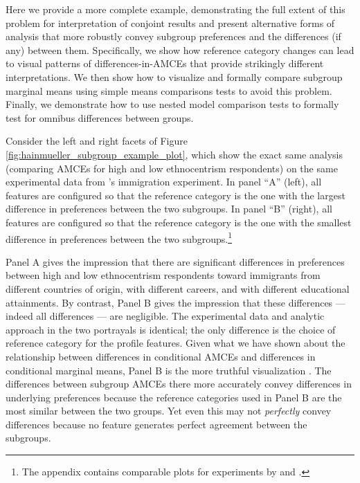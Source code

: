 \documentclass[a4paper,12pt]{article}\usepackage[]{graphicx}\usepackage[]{color}
\begin{document}
Here we provide a more complete example, demonstrating the full extent of this problem for interpretation of conjoint results and present alternative forms of analysis that more robustly convey subgroup preferences and the differences (if any) between them. Specifically, we show how reference category changes can lead to visual patterns of differences-in-AMCEs that provide strikingly different interpretations. We then show how to visualize and formally compare subgroup marginal means using simple means comparisons tests to avoid this problem. Finally, we demonstrate how to use nested model comparison tests to formally test for omnibus differences between groups.

Consider the left and right facets of Figure \ref{fig:hainmueller_subgroup_example_plot}, which show the exact same analysis (comparing AMCEs for high and low ethnocentrism respondents) on the same experimental data from \citeauthor{HainmuellerHopkinsYamamoto2014}'s immigration experiment. In panel ``A'' (left), all features are configured so that the reference category is the one with the largest difference in preferences between the two subgroups. In panel ``B'' (right), all features are configured so that the reference category is the one with the smallest difference in preferences between the two subgroups.\footnote{The appendix contains comparable plots for experiments by \citet{BechtelScheve2013} and \citet{TeeleKallaRosenbluth2018}.}

Panel A gives the impression that there are significant differences in preferences between high and low ethnocentrism respondents toward immigrants from different countries of origin, with different careers, and with different educational attainments. By contrast, Panel B gives the impression that these differences --- indeed all differences --- are negligible. The experimental data and analytic approach in the two portrayals is identical; the only difference is the choice of reference category for the profile features. Given what we have shown about the relationship between differences in conditional AMCEs and differences in conditional marginal means, Panel B is the more truthful visualization \citep{Cairo2016}. The differences between subgroup AMCEs there more accurately convey differences in underlying preferences because the reference categories used in Panel B are the most similar between the two groups. Yet even this may not \textit{perfectly} convey differences because no feature generates perfect agreement between the subgroups.
\end{document}
